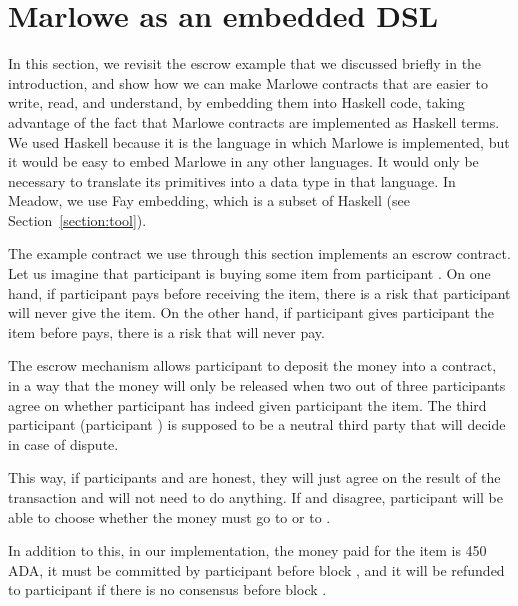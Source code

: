\documentclass[runningheads]{llncs}
\begin{document}
\section{Marlowe as an embedded DSL}
\label{section:example-escrow}

In this section, we revisit the escrow example that we discussed briefly in the introduction, and show how we can make 
Marlowe contracts that are easier to write, read, and understand, by embedding them into Haskell code, taking advantage 
of the fact that Marlowe contracts are implemented as Haskell terms. We used Haskell because it is the language in 
which Marlowe is implemented, but it would be easy to embed Marlowe in any other languages. It would only be necessary 
to translate its primitives into a data type in that language. In Meadow, we use Fay embedding, which is a subset of 
Haskell (see Section~\ref{section:tool}).

The example contract we use through this section implements an escrow contract. Let us imagine that participant 
 is buying some item from participant . On one hand, if participant  
pays before receiving the item, there is a risk that participant  will never give  the 
item. On the other hand, if participant  gives participant  the item before 
 pays,  there is a risk that  will never pay.

The escrow mechanism allows participant  to deposit the money into a contract, in a way that the money 
will only be released when two out of three participants agree on whether participant  has indeed given 
participant  the item. The third participant (participant ) is supposed to be a 
neutral third party that will decide in case of dispute.

This way, if participants  and  are honest, they will just agree on the result of the 
transaction and  will not need to do anything. If  and  disagree, 
participant  will be able to choose whether the money must go to  or to 
.

In addition to this, in our implementation, the money paid for the item is 450 ADA, it must be committed by participant 
 before block , and it will be refunded to participant  if there is 
no consensus before block .
\end{document}
